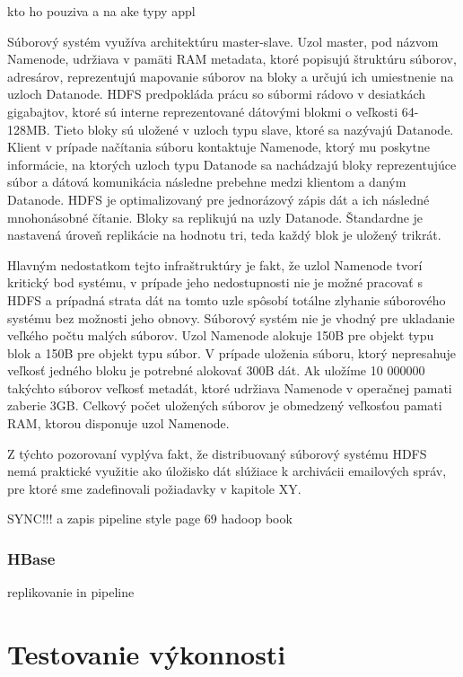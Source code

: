 \documentclass[11pt,twoside,a4paper]{book}
\begin{document}
kto ho pouziva a na ake typy appl


Súborový systém využíva architektúru master-slave. Uzol master, pod názvom Namenode, udržiava v pamäti RAM metadata, ktoré popisujú štruktúru súborov, adresárov, reprezentujú mapovanie súborov na bloky a určujú ich umiestnenie na uzloch Datanode. HDFS predpokláda prácu so súbormi rádovo v desiatkách gigabajtov, ktoré sú interne reprezentované dátovými blokmi o veľkosti  64-128MB. Tieto bloky sú uložené v uzloch typu slave, ktoré sa nazývajú Datanode. Klient v prípade načítania súboru kontaktuje Namenode, ktorý mu poskytne informácie, na ktorých uzloch typu Datanode sa nachádzajú bloky reprezentujúce súbor a dátová komunikácia následne prebehne medzi klientom a daným Datanode. HDFS je optimalizovaný pre jednorázový zápis dát a ich následné mnohonásobné čítanie. Bloky sa replikujú na uzly Datanode. Štandardne je nastavená úroveň replikácie na hodnotu tri, teda každý blok je uložený trikrát.


Hlavným nedostatkom tejto infraštruktúry je fakt, že uzlol Namenode tvorí kritický bod systému, v prípade jeho nedostupnosti nie je možné pracovať s HDFS a prípadná strata dát na tomto uzle spôsobí totálne zlyhanie súborového systému bez možnosti jeho obnovy. Súborový systém nie je vhodný pre ukladanie veľkého počtu malých súborov.
Uzol Namenode alokuje 150B pre objekt typu blok a 150B pre objekt typu súbor. V prípade uloženia súboru, ktorý nepresahuje veľkosť jedného bloku je potrebné alokovať 300B dát. Ak uložíme 10 000000 takýchto súborov veľkosť metadát, ktoré udržiava Namenode v operačnej pamati zaberie 3GB. Celkový počet uložených súborov je obmedzený veľkosťou pamati RAM, ktorou disponuje uzol Namenode.

Z týchto pozorovaní vyplýva fakt, že distribuovaný súborový systému HDFS nemá praktické využitie ako úložisko dát slúžiace k archivácii emailových správ, pre ktoré sme zadefinovali požiadavky v kapitole XY.

SYNC!!! a zapis pipeline style
 page 69 hadoop book
\subsection*{HBase}

replikovanie in pipeline

\chapter{Testovanie výkonnosti}
\end{document}
